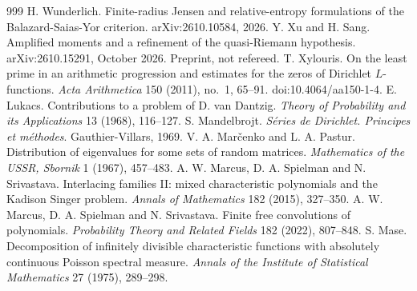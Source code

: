 \begin{thebibliography}{999}
 H. Wunderlich. Finite-radius Jensen and relative-entropy formulations of the Balazard-Saias-Yor criterion. arXiv:2610.10584, 2026.
 Y. Xu and H. Sang. Amplified moments and a refinement of the quasi-Riemann hypothesis. arXiv:2610.15291, October 2026. Preprint, not refereed. %
 T. Xylouris. On the least prime in an arithmetic progression and estimates for the zeros of Dirichlet $L$-functions. \emph{Acta Arithmetica} 150 (2011), no.~1, 65--91. doi:10.4064/aa150-1-4. %
 E. Lukacs. Contributions to a problem of D. van Dantzig. \emph{Theory of Probability and its Applications} 13 (1968), 116--127.
 S. Mandelbrojt. \emph{S\'eries de Dirichlet. Principes et m\'ethodes}. Gauthier-Villars, 1969.
 V. A. Mar\v{c}enko and L. A. Pastur. Distribution of eigenvalues for some sets of random matrices. \emph{Mathematics of the USSR, Sbornik} 1 (1967), 457--483.
 A. W. Marcus, D. A. Spielman and N. Srivastava. Interlacing families II: mixed characteristic polynomials and the Kadison Singer problem. \emph{Annals of Mathematics} 182 (2015), 327--350.
 A. W. Marcus, D. A. Spielman and N. Srivastava. Finite free convolutions of polynomials. \emph{Probability Theory and Related Fields} 182 (2022), 807--848.
 S. Mase. Decomposition of infinitely divisible characteristic functions with absolutely continuous Poisson spectral measure. \emph{Annals of the Institute of Statistical Mathematics} 27 (1975), 289--298.

\end{thebibliography}

